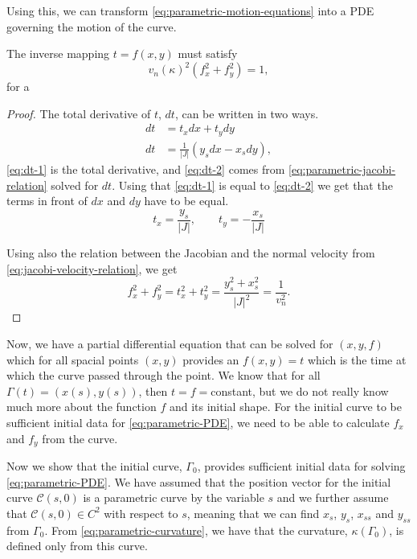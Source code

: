 Using this, we can transform \eqref{eq:parametric-motion-equations} into a PDE governing the motion of the curve.
\begin{proposition}
    The inverse mapping $t=f(x, y)$ must satisfy 
    \begin{equation}
        v_n(\kappa)^2(f_x^2 + f_y^2) = 1,
        \label{eq:parametric-PDE}
    \end{equation}
    for a 
\end{proposition}
\begin{proof}
The total derivative of $t$, $dt$, can be written in two ways. 
\begin{align}
    dt &= t_x dx + t_y dy  \label{eq:dt-1}\\
    dt &= \frac{1}{|J|}(y_s dx - x_s dy) \label{eq:dt-2},
\end{align}
\eqref{eq:dt-1} is the total derivative, and \eqref{eq:dt-2} comes from \eqref{eq:parametric-jacobi-relation} solved for $dt$. Using that \eqref{eq:dt-1} is equal to \eqref{eq:dt-2} we get that the terms in front of $dx$ and $dy$ have to be equal. 
\begin{equation}
    t_x = \frac{y_s}{|J|}, \qquad t_y = -\frac{x_s}{|J|}
    \label{eq:t-jacobian}
\end{equation}

Using also the relation between the Jacobian and the normal velocity from \eqref{eq:jacobi-velocity-relation}, we get
\begin{equation*}
    f_x^2+f_y^2 = t_x^2+t_y^2 = \frac{y_s^2 + x_s^2}{|J|^2} = \frac{1}{v_n^2}.
\end{equation*}
\end{proof}

Now, we have a partial differential equation that can be solved for $(x, y, f)$ which for all spacial points $(x, y)$ provides an $f(x, y) = t$ which is the time at which the curve passed through the point. We know that for all $\Gamma (t) = (x(s), y(s))$, then $t=f=$constant, but we do not really know much more about the function $f$ and its initial shape. For the initial curve to be sufficient initial data for \eqref{eq:parametric-PDE}, we need to be able to calculate $f_x$ and $f_y$ from the curve. 


Now we show that the initial curve, $\Gamma_0$, provides sufficient initial data for solving \eqref{eq:parametric-PDE}. We have assumed that the position vector for the initial curve $\mathcal{C}(s, 0)$ is a parametric curve by the variable $s$ and we further assume that $\mathcal{C}(s, 0) \in C^2$ with respect to $s$, meaning that we can find $x_s$, $y_s$, $x_{ss}$ and $y_{ss}$ from $\Gamma_0$. From \eqref{eq:parametric-curvature}, we have that the curvature, $\kappa(\Gamma_0)$, is defined only from this curve. 

